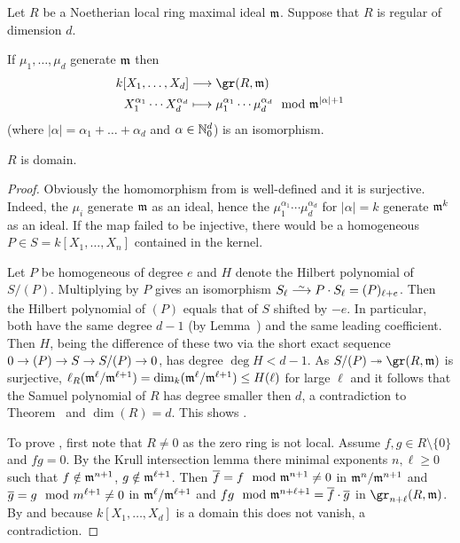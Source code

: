 \documentclass[a4paper,parskip=half,numbers=enddot, DIV=12]{scrreprt}
\begin{document}
\begin{cor}
    Let $R$ be a Noetherian local ring maximal ideal $\mathfrak{m}$. Suppose that $R$ is regular of dimension $d$.
    \begin{alphanumerate}
    \item 
        If $\mu_1,\ldots, \mu_d$ generate $\mathfrak{m}$ then 
        \begin{align*} 
            k[X_1,\ldots, X_d] &\morphism \gr(R,\mm)\\
            X_1^{\alpha_1}\cdots X_d^{\alpha_d} &\longmapsto \mu_1^{\alpha_1}\cdots\mu_d^{\alpha_d} \mod \mm^{|\alpha| +1}
        \end{align*}
        (where $|\alpha|=\alpha_1+\ldots+\alpha_d$ and $\alpha\in\mathbb{N}_0^d$) is an isomorphism.
    \item 
        $R$ is domain.
    \end{alphanumerate}
\end{cor}
\begin{proof}
    Obviously the homomorphism from  is well-defined and it is surjective. Indeed, the $\mu_i$ generate $\mathfrak{m}$ as an ideal, hence the $\mu_1^{\alpha_1}\cdots\mu_d^{\alpha_d}$ for $|\alpha|=k$ generate $\mathfrak{m}^k$ as an ideal. If the map failed to be injective, there would be a homogeneous $P\in S=k[X_1,\ldots, X_n]$ contained in the kernel. 
    
    Let $P$ be homogeneous of degree $e$ and $H$ denote the Hilbert polynomial of $S/(P)$. Multiplying by $P$ gives an isomorphism $S_\ell\isomorphism P\cdot S_\ell=(P)_{\ell+e}$. Then the Hilbert polynomial of $(P)$ equals that of $S$ shifted by $-e$. In particular, both have the same degree $d-1$ (by Lemma~) and the same leading coefficient. Then $H$, being the difference of these two via the short exact sequence $0\morphism (P)\morphism S\morphism S/(P)\morphism 0$, has degree $\deg H < d-1$. As $S/(P)\epimorphism \gr (R,\mm)$ is surjective, $\ell_R(\mathfrak{m}^\ell /\mathfrak{m}^{\ell+1}) = \dim_k(\mathfrak{m}^\ell/\mathfrak{m}^{\ell+1}) \leq H(\ell)$ for large $\ell$ and it follows that the Samuel polynomial of $R$ has degree smaller then $d$, a contradiction to Theorem~ and $\dim(R) = d$. This shows .
    
    To prove , first note that $R\neq 0$ as the zero ring is not local. Assume $f,g\in R\setminus\{0\}$ and $fg = 0$. By the Krull intersection lemma there minimal exponents $n,\ell \geq 0$ such that $f\notin \mathfrak{m}^{n+1}$, $g\notin \mathfrak{m}^{\ell+1}$. Then $\overline f = f\mod {\mathfrak{m}}^{n+1} \neq 0 $ in $\mathfrak{m}^n/\mathfrak{m}^{n+1}$ and $\overline g= g\mod m^{\ell+1}\neq 0$ in $\mathfrak{m}^\ell/\mathfrak{m}^{\ell+1}$ and $fg\mod {\mathfrak{m}}^{n+\ell+1} = \overline f\cdot \overline g$ in $\gr_{n+\ell}(R,\mm)$. By  and because $k[X_1,\ldots, X_d]$ is a domain this does not vanish, a contradiction.
\end{proof} 
\end{document}
